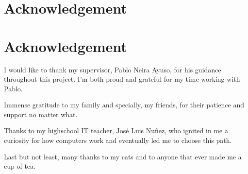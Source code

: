 \chapter*{Acknowledgement}
\chapter*{Acknowledgement}
I would like to thank my supervisor, Pablo Neira Ayuso, for his guidance throughout this project. I’m both proud and grateful for my time working with Pablo.

Immense gratitude to my family and specially, my friends, for their patience and support no matter what.

Thanks to my highschool IT teacher, José Luis Nuñez, who ignited in me a curiosity for how computers work and eventually led me to choose this path.

Last but not least, many thanks to my cats and to anyone that ever made me a cup of tea.
